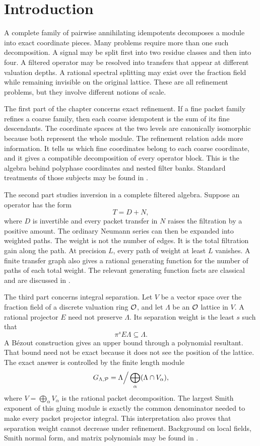 \section{Introduction}

A complete family of pairwise annihilating idempotents decomposes a module into exact coordinate pieces.  Many problems require more than one such decomposition.  A signal may be split first into two residue classes and then into four.  A filtered operator may be resolved into transfers that appear at different valuation depths.  A rational spectral splitting may exist over the fraction field while remaining invisible on the original lattice.  These are all refinement problems, but they involve different notions of scale.

The first part of the chapter concerns exact refinement.  If a fine packet family refines a coarse family, then each coarse idempotent is the sum of its fine descendants.  The coordinate spaces at the two levels are canonically isomorphic because both represent the whole module.  The refinement relation adds more information.  It tells us which fine coordinates belong to each coarse coordinate, and it gives a compatible decomposition of every operator block.  This is the algebra behind polyphase coordinates and nested filter banks.  Standard treatments of those subjects may be found in \cite{Vaidyanathan1993,Daubechies1992}.

The second part studies inversion in a complete filtered algebra.  Suppose an operator has the form
\[
T=D+N,
\]
where $D$ is invertible and every packet transfer in $N$ raises the filtration by a positive amount.  The ordinary Neumann series can then be expanded into weighted paths.  The weight is not the number of edges.  It is the total filtration gain along the path.  At precision $L$, every path of weight at least $L$ vanishes.  A finite transfer graph also gives a rational generating function for the number of paths of each total weight.  The relevant generating function facts are classical and are discussed in \cite{Stanley2012}.

The third part concerns integral separation.  Let $V$ be a vector space over the fraction field of a discrete valuation ring ${\mathcal O}$, and let $\Lambda$ be an ${\mathcal O}$ lattice in $V$.  A rational projector $E$ need not preserve $\Lambda$.  Its separation weight is the least $s$ such that
\[
\pi^sE\Lambda\subseteq\Lambda.
\]
A Bézout construction gives an upper bound through a polynomial resultant.  That bound need not be exact because it does not see the position of the lattice.  The exact answer is controlled by the finite length module
\[
G_{\Lambda,\mathcal P}
=
\Lambda\Big/\bigoplus_{\alpha}(\Lambda\cap V_\alpha),
\]
where $V=\bigoplus_\alpha V_\alpha$ is the rational packet decomposition.  The largest Smith exponent of this gluing module is exactly the common denominator needed to make every packet projector integral.  This interpretation also proves that separation weight cannot decrease under refinement.  Background on local fields, Smith normal form, and matrix polynomials may be found in \cite{Serre1979,Newman1972,GohbergLancasterRodman2009}.

